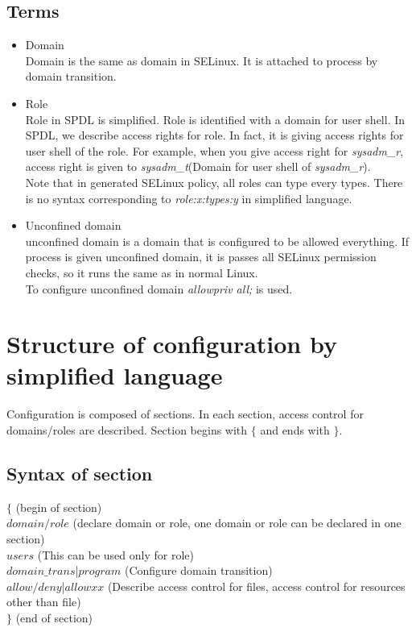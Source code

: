 \documentclass{article}
\begin{document}
\subsection{Terms}
\begin{itemize}
\item Domain \\
 Domain is the same as domain in SELinux. It is attached to process by domain transition.
\item Role\\
 Role in SPDL is simplified. Role is identified
      with a domain for user shell. In SPDL, we describe access
      rights for role. In fact, it is giving access rights for user
      shell of the role. For example, when you give access right for
      {\it sysadm\_r}, access right is given to 
{\it sysadm\_t}(Domain for user shell of {\it sysadm\_r}).\\
 Note that in generated SELinux policy, all roles can type every types.
      There is no syntax corresponding to {\it role:x:types:y} in
      simplified language.
\item Unconfined domain\\
unconfined domain is a domain that is configured to be allowed
      everything. If process is given unconfined domain, it is passes
      all SELinux permission checks, so it runs the same as in normal Linux.\\

To configure unconfined domain {\it allowpriv all;} is used.
\end{itemize}                  

\section{Structure of configuration by simplified language}
Configuration is composed of sections. In each section, access control for domains/roles are described. Section begins with $\{$ and ends with $\}$. 

\subsection{Syntax of section}

$\{$  (begin of section)\\
$domain/role$  (declare domain or role, one domain or role can be declared in one section) \\
$users$  (This can be used only for role)\\
$domain\_trans$|$program$ (Configure domain transition)\\
$allow/deny$|$allowxx$  (Describe access control for files, access control for resources other than file)\\
$\}$  (end of section)\\
\end{document}
